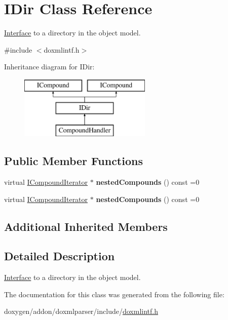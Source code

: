 \hypertarget{class_i_dir}{}\section{I\+Dir Class Reference}
\label{class_i_dir}


\mbox{\hyperlink{class_interface}{Interface}} to a directory in the object model.  




{\ttfamily \#include $<$doxmlintf.\+h$>$}

Inheritance diagram for I\+Dir\+:\begin{figure}[H]
\begin{center}
\leavevmode
\includegraphics[height=3.000000cm]{class_i_dir}
\end{center}
\end{figure}
\subsection*{Public Member Functions}
\begin{DoxyCompactItemize}
\item 
\mbox{\label{class_i_dir_a61c739ec50eb7d620a10b2d11f85c54b}} 
virtual \mbox{\hyperlink{class_i_compound_iterator}{I\+Compound\+Iterator}} $\ast$ {\bfseries nested\+Compounds} () const =0
\item 
\mbox{\label{class_i_dir_a61c739ec50eb7d620a10b2d11f85c54b}} 
virtual \mbox{\hyperlink{class_i_compound_iterator}{I\+Compound\+Iterator}} $\ast$ {\bfseries nested\+Compounds} () const =0
\end{DoxyCompactItemize}
\subsection*{Additional Inherited Members}


\subsection{Detailed Description}
\mbox{\hyperlink{class_interface}{Interface}} to a directory in the object model. 

The documentation for this class was generated from the following file\+:\begin{DoxyCompactItemize}
\item 
doxygen/addon/doxmlparser/include/\mbox{\hyperlink{include_2doxmlintf_8h}{doxmlintf.\+h}}\end{DoxyCompactItemize}
